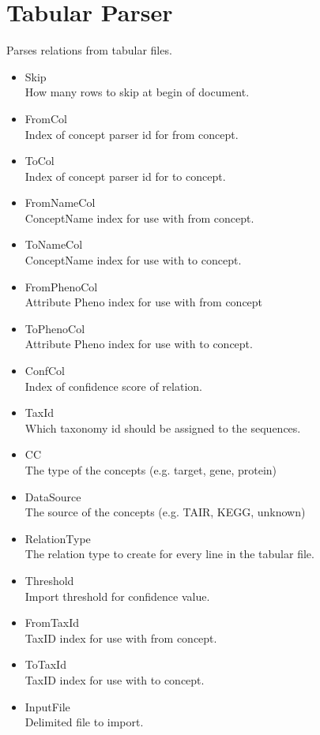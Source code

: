 \section{Tabular Parser}
Parses relations from tabular files.
\begin{itemize}
  \item{Skip}\\
  How many rows to skip at begin of document.
  \item{FromCol}\\
  Index of concept parser id for from concept.
  \item{ToCol}\\
  Index of concept parser id for to concept.
  \item{FromNameCol}\\
  ConceptName index for use with from concept.
  \item{ToNameCol}\\
  ConceptName index for use with to concept.
  \item{FromPhenoCol}\\
  Attribute Pheno index for use with from concept
  \item{ToPhenoCol}\\
  Attribute Pheno index for use with to concept.
  \item{ConfCol}\\
  Index of confidence score of relation.
  \item{TaxId}\\
  Which taxonomy id should be assigned to the sequences.
  \item{CC}\\
  The type of the concepts (e.g. target, gene, protein)
  \item{DataSource}\\
  The source of the concepts (e.g. TAIR, KEGG, unknown)
  \item{RelationType}\\
  The relation type to create for every line in the tabular file.
  \item{Threshold}\\
  Import threshold for confidence value.
  \item{FromTaxId}\\
  TaxID index for use with from concept.
  \item{ToTaxId}\\
  TaxID index for use with to concept.
  \item{InputFile}\\
  Delimited file to import.
\end{itemize}
    
